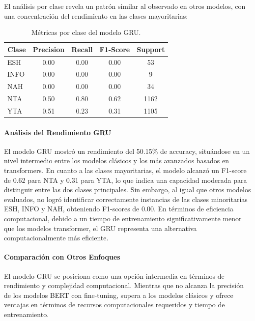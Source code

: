 El análisis por clase revela un patrón similar al observado en otros modelos, con una concentración del rendimiento en las clases mayoritarias:

\begin{table}[H]
\centering
\caption{Métricas por clase del modelo GRU.}
\begin{tabular}{lcccc}
\toprule
\textbf{Clase} & \textbf{Precision} & \textbf{Recall} & \textbf{F1-Score} & \textbf{Support} \\
\midrule
ESH & 0.00 & 0.00 & 0.00 & 53 \\
INFO & 0.00 & 0.00 & 0.00 & 9 \\
NAH & 0.00 & 0.00 & 0.00 & 34 \\
NTA & 0.50 & 0.80 & 0.62 & 1162 \\
YTA & 0.51 & 0.23 & 0.31 & 1105 \\
\bottomrule
\end{tabular}
\end{table}

\paragraph{Análisis del Rendimiento GRU}

El modelo GRU mostró un rendimiento del 50.15\% de accuracy, situándose en un nivel intermedio entre los modelos clásicos y los más avanzados basados en transformers. En cuanto a las clases mayoritarias, el modelo alcanzó un F1-score de 0.62 para NTA y 0.31 para YTA, lo que indica una capacidad moderada para distinguir entre las dos clases principales. Sin embargo, al igual que otros modelos evaluados, no logró identificar correctamente instancias de las clases minoritarias ESH, INFO y NAH, obteniendo F1-scores de 0.00. En términos de eficiencia computacional, debido a un tiempo de entrenamiento significativamente menor que los modelos transformer, el GRU representa una alternativa computacionalmente más eficiente.

\paragraph{Comparación con Otros Enfoques}

El modelo GRU se posiciona como una opción intermedia en términos de rendimiento y complejidad computacional. Mientras que no alcanza la precisión de los modelos BERT con fine-tuning, supera a los modelos clásicos y ofrece ventajas en términos de recursos computacionales requeridos y tiempo de entrenamiento.

